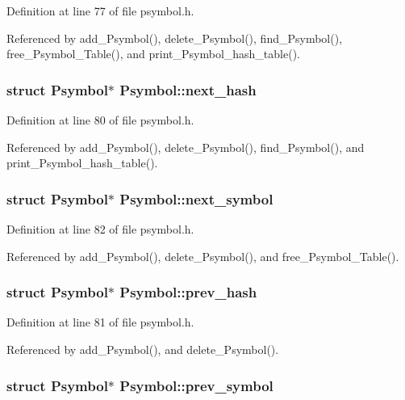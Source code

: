 Definition at line 77 of file psymbol.h.

Referenced by add\_\-Psymbol(), delete\_\-Psymbol(), find\_\-Psymbol(), free\_\-Psymbol\_\-Table(), and print\_\-Psymbol\_\-hash\_\-table().
\subsubsection{\setlength{\rightskip}{0pt plus 5cm}struct \bf{Psymbol}$\ast$ \bf{Psymbol::next\_\-hash}}\label{structPsymbol_4180fa3ddc9d8955e2d494e58a05cb23}




Definition at line 80 of file psymbol.h.

Referenced by add\_\-Psymbol(), delete\_\-Psymbol(), find\_\-Psymbol(), and print\_\-Psymbol\_\-hash\_\-table().
\subsubsection{\setlength{\rightskip}{0pt plus 5cm}struct \bf{Psymbol}$\ast$ \bf{Psymbol::next\_\-symbol}}\label{structPsymbol_57064d64de3f2c401ebd1f9c1fd35b90}




Definition at line 82 of file psymbol.h.

Referenced by add\_\-Psymbol(), delete\_\-Psymbol(), and free\_\-Psymbol\_\-Table().
\subsubsection{\setlength{\rightskip}{0pt plus 5cm}struct \bf{Psymbol}$\ast$ \bf{Psymbol::prev\_\-hash}}\label{structPsymbol_2a1a444508e588886a97af0bad70b54e}




Definition at line 81 of file psymbol.h.

Referenced by add\_\-Psymbol(), and delete\_\-Psymbol().
\subsubsection{\setlength{\rightskip}{0pt plus 5cm}struct \bf{Psymbol}$\ast$ \bf{Psymbol::prev\_\-symbol}}\label{structPsymbol_67605df0d0a21b952b56b518f50f8cf5}




